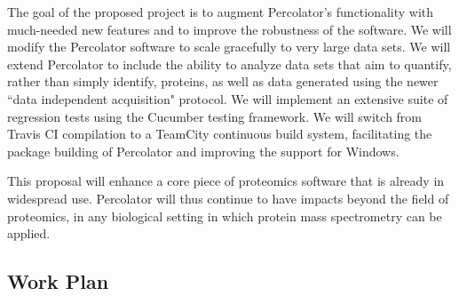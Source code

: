 \documentclass{article}
\begin{document}
The goal of the proposed project is to augment Percolator's
functionality with much-needed new features and to improve the
robustness of the software.
We will modify the Percolator software to scale gracefully to very
large data sets.
We will extend Percolator to include the ability to analyze data
sets that aim to quantify, rather than simply identify, proteins, as
well as data generated using the newer ``data independent acquisition"
protocol.
We will implement an extensive suite of regression tests using the
Cucumber testing framework.
We will switch from Travis CI compilation to a TeamCity continuous
build system, facilitating the package building of Percolator and improving the support for Windows.

This proposal will enhance a core piece of proteomics software that is
already in widespread use.  Percolator will thus continue to have
impacts beyond the field of proteomics, in any biological setting in
which protein mass spectrometry can be applied.

\subsection{Work Plan}
\end{document}
